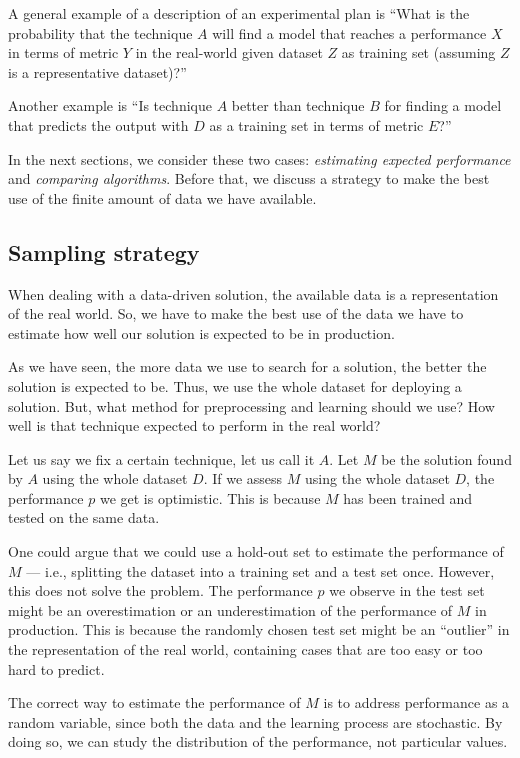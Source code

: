A general example of a description of an experimental plan is ``What is the probability that
the technique $A$ will find a \gls{model} that reaches a performance $X$ in terms of metric $Y$ in
the real-world given dataset $Z$ as training set (assuming $Z$ is a representative
dataset)?''

Another example is ``Is technique $A$ better than technique $B$ for finding a \gls{model} that
predicts the output with $D$ as a training set in terms of metric $E$?''

In the next sections, we consider these two cases: \emph{estimating expected performance}
and \emph{comparing algorithms}.  Before that, we discuss a strategy to make the best use
of the finite amount of data we have available.

\subsection{Sampling strategy}

When dealing with a data-driven solution, the available data is a representation of the
real world.  So, we have to make the best use of the data we have to estimate how well our
solution is expected to be in production.

As we have seen, the more data we use to search for a solution, the better the solution is
expected to be.  Thus, we use the whole dataset for deploying a solution.  But, what
method for preprocessing and learning should we use?  How well is that technique
expected to perform in the real world?

Let us say we fix a certain technique, let us call it $A$.  Let $M$ be the solution found
by $A$ using the whole dataset $D$.  If we assess $M$ using the whole dataset $D$, the
performance $p$ we get is optimistic.  This is because $M$ has been trained and tested
on the same data.

One could argue that we could use a hold-out set to estimate the performance of $M$ ---
i.e., splitting the dataset into a training set and a test set once.  However, this does
not solve the problem.  The performance $p$ we observe in the test set might be an overestimation
or an underestimation of the performance of $M$ in production.  This is because the
randomly chosen test set might be an ``outlier'' in the representation of the real world,
containing cases that are too easy or too hard to predict.

The correct way to estimate the performance of $M$ is to address performance as a
random variable, since both the data and the learning process are stochastic.
By doing so, we can study the distribution of the performance, not particular values.

